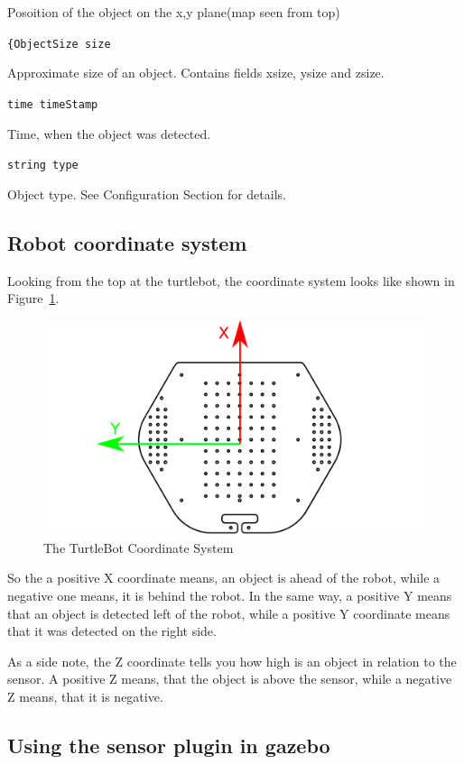 Posoition of the object on the x,y plane(map seen from top)

\verb${ObjectSize size$

Approximate size of an object. Contains fields xsize, ysize and zsize.

\verb$time timeStamp$

Time, when the object was detected.

\verb$string type$

Object type. See Configuration Section for details.

\subsection{Robot coordinate system}

Looking from the top at the turtlebot, the coordinate system looks like shown in Figure~\ref{fig:TurtleBotCoordinates}.
\begin{figure}[htbp]
  \includegraphics[width=1.0\textwidth]{ttbtop.pdf} 
  \caption{The TurtleBot Coordinate System}
  \label{fig:TurtleBotCoordinates}
\end{figure}

So the a positive X coordinate means, an object is ahead of the robot, while a negative one means, it is behind the robot. In the same way, a positive Y means that an object is detected left of the robot, while a positive Y coordinate means that it was detected on the right side.

As a side note, the Z coordinate tells you how high is an object in relation to the sensor. A positive Z means, that the object is above the sensor, while a negative Z means, that it is negative.

\subsection{Using the sensor plugin in gazebo}

